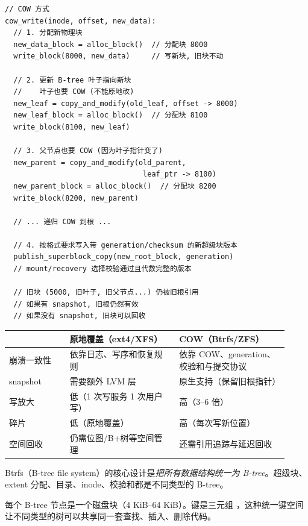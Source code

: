 \begin{filesystemlayout}
\begin{lstlisting}
// COW 方式
cow_write(inode, offset, new_data):
  // 1. 分配新物理块
  new_data_block = alloc_block()  // 分配块 8000
  write_block(8000, new_data)     // 写新块, 旧块不动

  // 2. 更新 B-tree 叶子指向新块
  //    叶子也要 COW (不能原地改)
  new_leaf = copy_and_modify(old_leaf, offset -> 8000)
  new_leaf_block = alloc_block()  // 分配块 8100
  write_block(8100, new_leaf)

  // 3. 父节点也要 COW (因为叶子指针变了)
  new_parent = copy_and_modify(old_parent,
                                leaf_ptr -> 8100)
  new_parent_block = alloc_block()  // 分配块 8200
  write_block(8200, new_parent)

  // ... 递归 COW 到根 ...

  // 4. 按格式要求写入带 generation/checksum 的新超级块版本
  publish_superblock_copy(new_root_block, generation)
  // mount/recovery 选择校验通过且代数完整的版本

  // 旧块 (5000, 旧叶子, 旧父节点...) 仍被旧根引用
  // 如果有 snapshot, 旧根仍然有效
  // 如果没有 snapshot, 旧块可以回收
\end{lstlisting}

\begin{longtable}{|F{0.2\linewidth}|F{0.36\linewidth}|F{0.36\linewidth}|}
\toprule
{}
& 原地覆盖（ext4/XFS） & COW（Btrfs/ZFS） \\
\midrule
崩溃一致性 & 依靠日志、写序和恢复规则 & 依靠 COW、generation、校验和与提交协议 \\\tablerowrule
snapshot & 需要额外 LVM 层 & 原生支持（保留旧根指针） \\\tablerowrule
写放大 & 低（1 次写服务 1 次用户写） & 高（3--6 倍） \\\tablerowrule
碎片 & 低（原地覆盖） & 高（每次写新位置） \\\tablerowrule
空间回收 & 仍需位图/B+树等空间管理 & 还需引用追踪与延迟回收 \\
\bottomrule
\end{longtable}


Btrfs（B-tree file system）的核心设计是\emph{把所有数据结构统一为 B-tree}。超级块、extent 分配、目录、inode、校验和都是不同类型的 B-tree。

每个 B-tree 节点是一个磁盘块（4 KiB--64 KiB）。键是三元组 ，这种统一键空间让不同类型的树可以共享同一套查找、插入、删除代码。


\end{filesystemlayout}
